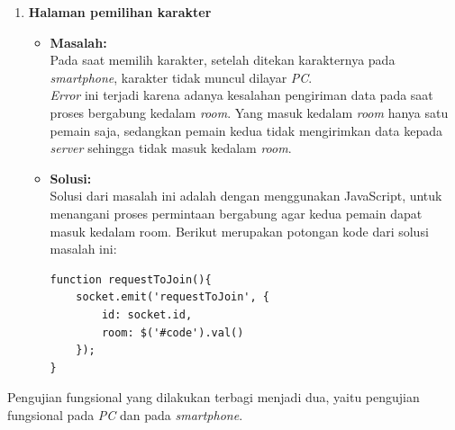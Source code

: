 \begin{enumerate}
	\item \textbf{Halaman pemilihan karakter}
	\begin{itemize}
		\item \textbf{Masalah:} \\
		Pada saat memilih karakter, setelah ditekan karakternya pada \textit{smartphone}, karakter tidak muncul dilayar \textit{PC}.\\
		
		\textit{Error} ini terjadi karena adanya kesalahan pengiriman data pada saat proses bergabung kedalam \textit{room}. Yang masuk kedalam \textit{room} hanya satu pemain saja, sedangkan pemain kedua tidak mengirimkan data kepada \textit{server} sehingga tidak masuk kedalam \textit{room}.
		
		\item \textbf{Solusi:} \\
		Solusi dari masalah ini adalah dengan menggunakan JavaScript, untuk menangani proses permintaan bergabung agar kedua pemain dapat masuk kedalam room. Berikut merupakan potongan kode dari solusi masalah ini:
		
\begin{lstlisting}[caption={Proses menangani memancarkan \textit{event}}, label={lst:submitEvent},captionpos=b]
function requestToJoin(){
	socket.emit('requestToJoin', {
		id: socket.id,
		room: $('#code').val()
	});
}
\end{lstlisting}
	\end{itemize}
\end{enumerate}

Pengujian fungsional yang dilakukan terbagi menjadi dua, yaitu pengujian fungsional pada \textit{PC} dan pada \textit{smartphone}.

